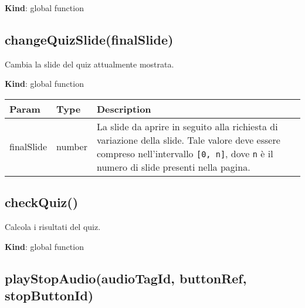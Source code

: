 \textbf{Kind}: global function\\

\hypertarget{changequizslidefinalslide}{%
\subsection{changeQuizSlide(finalSlide)}\label{changequizslidefinalslide}}

Cambia la slide del quiz attualmente mostrata.

\textbf{Kind}: global function

\begin{longtable}[]{@{}lll@{}}
\toprule
\begin{minipage}[b]{0.30\columnwidth}\raggedright
Param\strut
\end{minipage} & \begin{minipage}[b]{0.30\columnwidth}\raggedright
Type\strut
\end{minipage} & \begin{minipage}[b]{0.30\columnwidth}\raggedright
Description\strut
\end{minipage}\tabularnewline
\midrule
\endhead
\begin{minipage}[t]{0.30\columnwidth}\raggedright
finalSlide\strut
\end{minipage} & \begin{minipage}[t]{0.30\columnwidth}\raggedright
number\strut
\end{minipage} & \begin{minipage}[t]{0.30\columnwidth}\raggedright
La slide da aprire in seguito alla richiesta di variazione della slide.
Tale valore deve essere compreso nell'intervallo \texttt{{[}0,\ n{]}},
dove \texttt{n} è il numero di slide presenti nella pagina.\strut
\end{minipage}\tabularnewline
\bottomrule
\end{longtable}

\hypertarget{checkquiz}{%
\subsection{checkQuiz()}\label{checkquiz}}

Calcola i risultati del quiz.

\textbf{Kind}: global function\\

\hypertarget{playstopaudioaudiotagid-buttonref-stopbuttonid}{%
\subsection{playStopAudio(audioTagId, buttonRef,
stopButtonId)}\label{playstopaudioaudiotagid-buttonref-stopbuttonid}}

